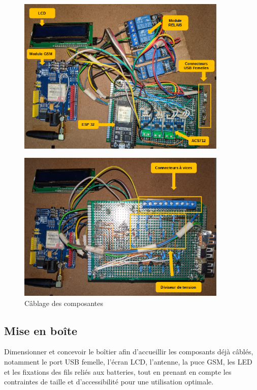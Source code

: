 \begin{figure}[H]
	\centering
	\includegraphics[width=10cm]{./img/composants/realisation.png}

	\label{fig:relais_5vdc}
\end{figure}
\begin{figure}[H]
	\centering
	\includegraphics[width=10cm]{./img/composants/realisationDos.png}
		\caption{Câblage des composantes}
	\label{fig:relais_5vdc}
\end{figure}

\subsection{Mise en boîte}
Dimensionner et concevoir le boîtier afin d'accueillir les composants déjà câblés, notamment le port USB femelle, l'écran LCD, l'antenne, la puce GSM, les LED et les fixations des fils reliés aux batteries, tout en prenant en compte les contraintes de taille et d'accessibilité pour une utilisation optimale.

